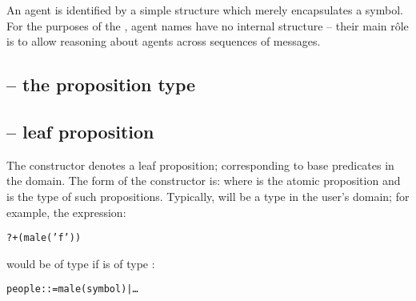 An agent is identified by a simple structure which merely encapsulates a symbol. For the purposes of the \gcl, agent names have no internal structure -- their main r\^ole is to allow reasoning about agents across sequences of messages.

\subsection{ -- the proposition type}

\subsection{ -- leaf proposition}
\label{gcl:leaf}

The  constructor denotes a leaf proposition; corresponding to base predicates in the domain. The form of the  constructor is:
where  is the atomic proposition and  is the type of such propositions. Typically,  will be a type in the user's domain; for example, the expression:
\begin{alltt}
?+(male('f'))
\end{alltt}
would be of type  if  is of type :
\begin{alltt}
people ::= male(symbol) | \ldots
\end{alltt}
